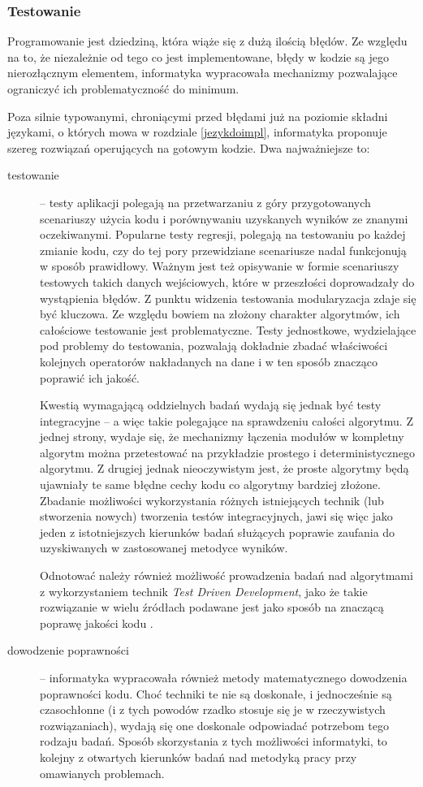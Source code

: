 \documentclass[12pt,a4paper]{report}
\begin{document}
{{{{{{{\subsubsection{Testowanie}
\par{
Programowanie jest dziedziną, która wiąże się z dużą ilością błędów. Ze względu na to, że niezależnie od tego co jest implementowane, błędy w kodzie są jego nierozłącznym elementem, informatyka wypracowała mechanizmy pozwalające ograniczyć ich problematyczność do minimum.
}
\par{
Poza silnie typowanymi, chroniącymi przed błędami już na poziomie składni językami, o których mowa w rozdziale \ref{jezykdoimpl}, informatyka proponuje szereg rozwiązań operujących na gotowym kodzie. Dwa najważniejsze to:
\begin{description}
\item[testowanie] -- testy aplikacji polegają na przetwarzaniu z góry przygotowanych scenariuszy użycia kodu i porównywaniu uzyskanych wyników ze znanymi oczekiwanymi. Popularne testy regresji, polegają na testowaniu po każdej zmianie kodu, czy do tej pory przewidziane scenariusze nadal funkcjonują w sposób prawidłowy. Ważnym jest też opisywanie w formie scenariuszy testowych takich danych wejściowych, które w przeszłości doprowadzały do wystąpienia błędów. Z punktu widzenia testowania modularyzacja zdaje się być kluczowa. Ze względu bowiem na złożony charakter algorytmów, ich całościowe testowanie jest problematyczne. Testy jednostkowe, wydzielające pod problemy do testowania, pozwalają dokładnie zbadać właściwości kolejnych operatorów nakładanych na dane i w ten sposób znacząco poprawić ich jakość.
\par{
Kwestią wymagającą oddzielnych badań wydają się jednak być testy integracyjne -- a więc takie polegające na sprawdzeniu całości algorytmu. Z jednej strony, wydaje się, że mechanizmy łączenia modułów w kompletny algorytm można przetestować na przykładzie prostego i deterministycznego algorytmu. Z drugiej jednak nieoczywistym jest, że proste algorytmy będą ujawniały te same błędne cechy kodu co algorytmy bardziej złożone. Zbadanie możliwości wykorzystania różnych istniejących technik (lub stworzenia nowych) tworzenia testów integracyjnych, jawi się więc jako jeden z istotniejszych kierunków badań służących poprawie zaufania do uzyskiwanych w zastosowanej metodyce wyników.
}
\par{
Odnotować należy również możliwość prowadzenia badań nad algorytmami z wykorzystaniem technik \emph{Test Driven Development}, jako że takie rozwiązanie w wielu źródłach podawane jest jako sposób na znaczącą poprawę jakości kodu \cite{CleanCode}.
}
\item[dowodzenie poprawności] -- informatyka wypracowała również metody matematycznego dowodzenia poprawności kodu. Choć techniki te nie są doskonałe, i jednocześnie są czasochłonne (i z tych powodów rzadko stosuje się je w rzeczywistych rozwiązaniach), wydają się one doskonale odpowiadać potrzebom tego rodzaju badań. Sposób skorzystania z tych możliwości informatyki, to kolejny z otwartych kierunków badań nad metodyką pracy przy omawianych problemach.
\end{description}
}

}}}}}}}
\end{document}
